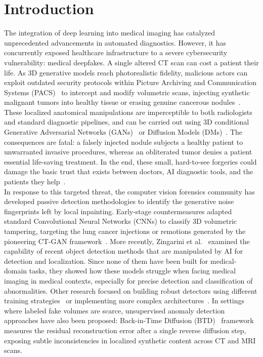 \documentclass[sigconf, screen, review, anonymous]{acmart}
\begin{document}
\section{Introduction}
The integration of deep learning into medical imaging has catalyzed unprecedented advancements in automated diagnostics. However, it has concurrently exposed healthcare infrastructure to a severe cybersecurity vulnerability: medical deepfakes. A single altered CT scan can cost a patient their life. As 3D generative models reach photorealistic fidelity, malicious actors can exploit outdated security protocols within Picture Archiving and Communication Systems (PACS)~\cite{solaiyappan2022machine} to intercept and modify volumetric scans, injecting synthetic malignant tumors into healthy tissue or erasing genuine cancerous nodules~\cite{mirsky2019ct}. These localized anatomical manipulations are imperceptible to both radiologists and standard diagnostic pipelines, and can be carried out using 3D conditional Generative Adversarial Networks (GANs)~\cite{goodfellow2014generative} or Diffusion Models (DMs)~\cite{sohl2015deep, rombach2022ldm}. The consequences are fatal: a falsely injected nodule subjects a healthy patient to unwarranted invasive procedures, whereas an obliterated tumor denies a patient essential life-saving treatment. In the end, these small, hard-to-see forgeries could damage the basic trust that exists between doctors, AI diagnostic tools, and the patients they help~\cite{pradepan2025comprehensive}.\\
In response to this targeted threat, the computer vision forensics community has developed passive detection methodologies to identify the generative noise fingerprints left by local inpainting. Early-stage countermeasures adapted standard Convolutional Neural Networks (CNNs) to classify 3D volumetric tampering, targeting the lung cancer injections or remotions generated by the pioneering CT-GAN framework~\cite{solaiyappan2022machine}. More recently, Zingarini et al.~\cite{zingarini2024m3dsynth} examined the capability of recent object detection methods that are manipulated by AI for detection and localization. Since none of them have been built for medical-domain tasks, they showed how these models struggle when facing medical imaging in medical contexts, especially for precise detection and classification of abnormalities. Other research focused on building robust detectors using different training strategies~\cite{dhanyalakshmi2026hybrid} or implementing more complex architectures~\cite{mahara2026forensic}. In settings where labeled fake volumes are scarce, unsupervised anomaly detection approaches have also been proposed: Back-in-Time Diffusion (BTD)~\cite{grabovski2025back} framework measures the residual reconstruction error after a single reverse diffusion step, exposing subtle inconsistencies in localized synthetic content across CT and MRI scans.\\
\end{document}
